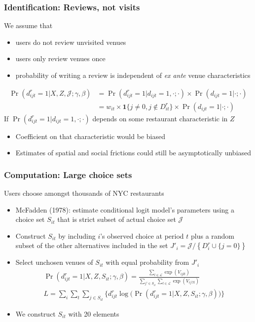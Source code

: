 \documentclass[11pt,notes=hide,aspectratio=169]{beamer}
\begin{document}
\begin{frame}
\frametitle{Identification: Reviews, not visits}
We assume that
\begin{itemize}
	\item users do not review unvisited venues
	\item users only review venues once
	\item probability of writing a review is independent of \emph{ex ante} venue characteristics
\end{itemize}
\begin{align*}
\Pr(d_{ijt}^{r}=1|X,Z,\mathcal{J};\gamma,\beta)	
&=
\Pr(d_{ijt}^{r}=1|d_{ijt}=1,\cdot;\cdot) \times \Pr(d_{ijt}=1|\cdot;\cdot)
\\
&=
w_{it} \times \mathbf{1}\{j\neq 0,j\notin D_{it}^{r}\} \times \Pr(d_{ijt}=1|\cdot;\cdot)
\end{align*}
\pause
If $\Pr(d_{ijt}^{r}=1|d_{ijt}=1,\cdot;\cdot)$ depends on some restaurant characteristic in $Z$
\begin{itemize}
	\item Coefficient on that characteristic would be biased
	\item Estimates of spatial and social frictions could still be asymptotically unbiased
\end{itemize}
\end{frame}
\begin{frame}
\frametitle{Computation: Large choice sets}
Users choose amongst thousands of NYC restaurants
\begin{itemize}
	\item McFadden (1978): estimate conditional logit model's parameters using a choice set $S_{it}$ that is strict subset of actual choice set $\mathcal{J}$
	\item Construct $S_{it}$ by including $i$'s observed choice at period $t$ plus a random subset of the other alternatives included in the set $J'_i = \mathcal{J} / \left\{D_{i}^{r} \cup \{j=0\}\right\}$
	\item Select unchosen venues of $S_{it}$ with equal probability from $J'_i$ 
		\begin{align*}
		\Pr(d_{ijt}^{r}=1|X,Z,S_{it};\gamma,\beta)	=\frac{\sum_{l\in\mathcal{L}}\exp(V_{ijlt})}{\sum_{j'\in S_{it}}\sum_{l\in\mathcal{L}}\exp(V_{ij'lt})} \\
		L=\sum_{i}\sum_{t}\sum_{j\in S_{it}}\Big\{ d_{ijt}^{r}\log\Big(\Pr\left(d_{ijt}^{r}=1|X,Z,S_{it};\gamma,\beta\right)\Big)\Big\}	
		\end{align*}
	\item We construct $S_{it}$ with 20 elements
\end{itemize}
\hypertarget{choice_set}{}
\end{frame}
\end{document}
